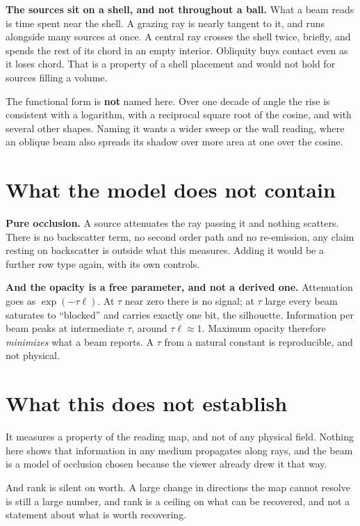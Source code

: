 \textbf{The sources sit on a shell, and not throughout a ball.} What a beam reads is time spent near the
shell. A grazing ray is nearly tangent to it, and runs alongside many sources at once. A central
ray crosses the shell twice, briefly, and spends the rest of its chord in an empty interior. Obliquity
buys contact even as it loses chord. That is a property of a shell placement and would not hold for
sources filling a volume.

The functional form is \textbf{not} named here. Over one decade of angle the rise is consistent with a
logarithm, with a reciprocal square root of the cosine, and with several other shapes. Naming it wants
a wider sweep or the wall reading, where an oblique beam also spreads its shadow over more area at one
over the cosine.

\section{What the model does not contain}

\textbf{Pure occlusion.} A source attenuates the ray passing it and nothing scatters. There is no
backscatter term, no second order path and no re-emission, any claim resting on backscatter is
outside what this measures. Adding it would be a further row type again, with its own controls.

\textbf{And the opacity is a free parameter, and not a derived one.} Attenuation goes as
\(\exp(-\tau \ell)\). At \(\tau\) near zero there is no signal; at \(\tau\) large every beam saturates
to ``blocked'' and carries exactly one bit, the silhouette. Information per beam peaks at intermediate
\(\tau\), around \(\tau \ell \approx 1\). Maximum opacity therefore \emph{minimizes} what a beam reports.
A \(\tau\) from a natural constant is reproducible, and not physical.

\section{What this does not establish}

It measures a property of the reading map, and not of any physical field. Nothing here shows that
information in any medium propagates along rays, and the beam is a model of occlusion chosen because
the viewer already drew it that way.

And rank is silent on worth. A large change in directions the map cannot resolve is still a large
number, and rank is a ceiling on what can be recovered, and not a statement about what is worth
recovering.
